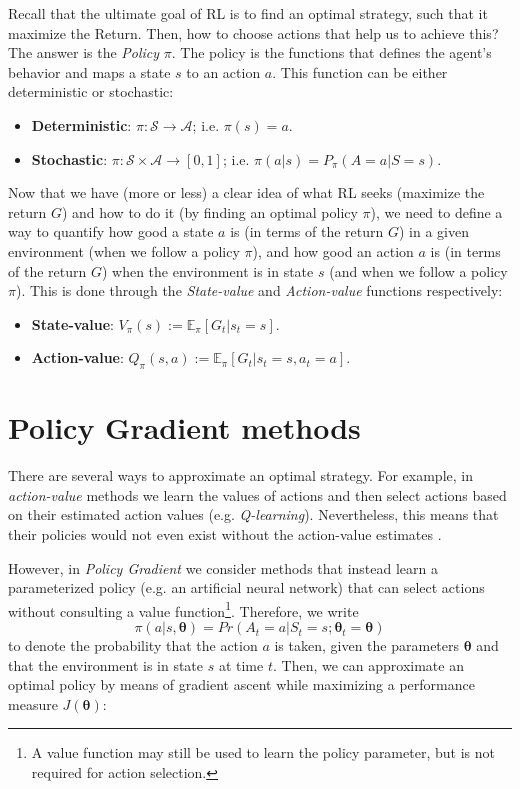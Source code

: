 \documentclass[twoside,twocolumn]{article}
\begin{document}
Recall that the ultimate goal of RL is to find an optimal strategy, such that it maximize the Return. Then, how to choose actions that help us to achieve this? The answer is the \emph{Policy} $\pi$. The policy is the functions that defines the agent’s behavior and maps a state $s$ to an action $a$. This function can be either deterministic or stochastic:

\begin{itemize}
  \item \textbf{Deterministic}: $\pi: \mathcal{S} \rightarrow \mathcal{A}$; i.e. $\pi(s)=a$.
  \item \textbf{Stochastic}: $\pi: \mathcal{S} \times \mathcal{A} \rightarrow [0, 1]$; i.e. $\pi(a|s)=P_{\pi}(A=a|S=s)$.
\end{itemize}

Now that we have (more or less) a clear idea of what RL seeks (maximize the return $G$) and how to do it (by finding an optimal policy $\pi$), we need to define a way to quantify how good a state $a$ is (in terms of the return $G$) in a given environment (when we follow a policy $\pi$), and how good an action $a$ is (in terms of the return $G$) when the environment is in state $s$ (and when we follow a policy $\pi$). This is done through the \emph{State-value} and \emph{Action-value} functions respectively:
\begin{itemize}
    \item \textbf{State-value}: $V_{\pi}(s):= \mathbb{E}_{\pi}[G_t|s_t=s]$.
    \item \textbf{Action-value}: $Q_{\pi}(s, a):= \mathbb{E}_{\pi}[G_t|s_t=s, a_t=a]$.
\end{itemize}


\section{Policy Gradient methods}

There are several ways to approximate an optimal strategy. For example, in \emph{action-value} methods we learn the values of actions and then select
actions based on their estimated action values (e.g. \textit{Q-learning}). Nevertheless, this means that their policies would not even exist without the action-value estimates \cite{Sutton1998}.

However, in \emph{Policy Gradient} we consider methods that instead learn a parameterized policy (e.g. an artificial neural network) that can select actions without consulting a value function\footnote{A value function may still be used to learn the policy parameter, but is not required for action selection.}.
Therefore, we write
$$\pi(a|s,\boldsymbol{\theta}) = Pr(A_t=a | S_t=s; \boldsymbol{\theta}_t=\boldsymbol{\theta})$$
 to denote the probability that the action $a$ is taken, given the parameters $\boldsymbol{\theta}$ and that the environment is in state $s$ at time $t$.
Then, we can approximate an optimal policy by means of gradient ascent while maximizing a performance measure $J(\boldsymbol{\theta})$:
\end{document}
